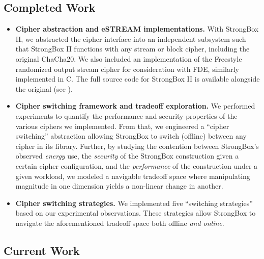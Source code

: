 \subsection{Completed Work}

\begin{itemize}
    \item \textbf{Cipher abstraction and eSTREAM implementations.} With
    StrongBox II, we abstracted the cipher interface into an independent
    subsystem such that StrongBox II functions with any stream or block cipher,
    including the original ChaCha20. We also included an implementation of the
    Freestyle randomized output stream cipher for consideration with FDE,
    similarly implemented in C. The full source code for StrongBox II is
    available alongside the original (see ).

    \item \textbf{Cipher switching framework and tradeoff exploration.} We
    performed experiments to quantify the performance and security properties of
    the various ciphers we implemented. From that, we engineered a ``cipher
    switching'' abstraction allowing StrongBox to switch (offline) between any
    cipher in its library. Further, by studying the contention between
    StrongBox's observed \emph{energy} use, the \emph{security} of the StrongBox
    construction given a certain cipher configuration, and the
    \emph{performance} of the construction under a given workload, we modeled a
    navigable tradeoff space where manipulating magnitude in one dimension
    yields a non-linear change in another.

    \item \textbf{Cipher switching strategies.} We implemented five ``switching
    strategies'' based on our experimental observations. These strategies allow
    StrongBox to navigate the aforementioned tradeoff space both offline
    \emph{and online}.
\end{itemize}

\subsection{Current Work}

